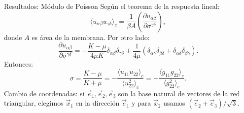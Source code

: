 \documentclass[xcolor=dvipsnames]{beamer}
\begin{document}
\begin{frame}{Resultados: Módulo de Poisson}
Según el teorema de la respuesta lineal:
\begin{equation*}
\langle u_{\alpha\beta}u_{\gamma\delta} \rangle_c
=\frac{1}{\beta A}\left(\frac{\partial u_{\alpha\beta}}{\partial \sigma^{\gamma\delta}}\right),
\end{equation*}
donde $A$ es área de la membrana. Por otro lado:
\begin{equation*}
\frac{\partial u_{\alpha\beta}}{\partial
  \sigma^{\gamma\delta}}=-\frac{K-\mu}{4\mu K}\delta_{\alpha\beta}\delta_{\gamma\delta}+\frac{1}{4\mu}(\delta_{\alpha\gamma}\delta_{\beta\delta}+\delta_{\alpha\delta}\delta_{\beta\gamma}).
\end{equation*}
Entonces:
\begin{equation*}
\sigma=\frac{K-\mu}{K+\mu}=-\frac{\langle u_{11}u_{22}
  \rangle_c}{\langle u_{22}^2 \rangle_c}=-\frac{\langle g_{11}g_{22}
  \rangle_c}{\langle g_{22}^2 \rangle_c}.
\end{equation*}
{\color{fblue} Cambio de coordenadas}: si $\vec{e}_1,\vec{e}_2,\vec{e}_3$ son
la base natural de vectores de la red triangular, elegimos
$\vec{x}_1$ en la dirección $\vec{e}_1$ y para $\vec{x}_2$ usamos
$(\vec{e}_2+\vec{e}_3)/\sqrt{3}$.

\end{frame}
\end{document}
